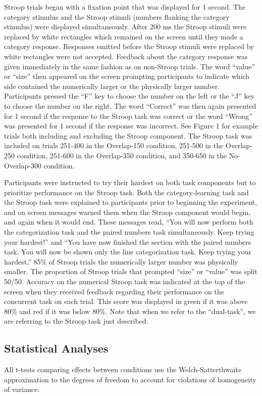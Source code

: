 \documentclass[apacite,draftfirst,man]{apa6}
\begin{document}
Stroop trials began with a fixation point that was displayed for 1 second. The
category stimulus and the Stroop stimuli (numbers flanking the category
stimulus) were displayed simultaneously. After 200 ms the Stroop stimuli were
replaced by white rectangles which remained on the screen until they made a
category response. Responses emitted before the Stroop stimuli were replaced by
white rectangles were not accepted. Feedback about the category response was
given immediately in the same fashion as on non-Stroop trials. The word
``value'' or ``size'' then appeared on the screen prompting participants to
indicate which side contained the numerically larger or the physically larger
number. Participants pressed the ``F'' key to choose the number on the left or
the ``J'' key to choose the number on the right. The word ``Correct'' was then
again presented for 1 second if the response to the Stroop task was correct or
the word ``Wrong'' was presented for 1 second if the response was incorrect. See
Figure 1 for example trials both including and excluding the Stroop component.
The Stroop task was included on trials 251-400 in the Overlap-150 condition,
251-500 in the Overlap-250 condition, 251-600 in the Overlap-350 condition, and
350-650 in the No-Overlap-300 condition.

Participants were instructed to try their hardest on both task components but to
prioritize performance on the Stroop task. Both the category-learning task and
the Stroop task were explained to participants prior to beginning the
experiment, and on screen messages warned them when the Stroop component would
begin, and again when it would end. These messages read, ``You will now perform
both the categorization task and the paired numbers task simultaneously. Keep
trying your hardest!'' and ``You have now finished the section with the paired
numbers task. You will now be shown only the line categorization task. Keep
trying your hardest.'' 85\% of Stroop trials the numerically larger number was
physically smaller. The proportion of Stroop trials that prompted ``size'' or
``value'' was split 50/50. Accuracy on the numerical Stroop task was indicated
at the top of the screen when they received feedback regarding their performance
on the concurrent task on each trial. This score was displayed in green if it
was above 80\% and red if it was below 80\%. Note that when we refer to the
``dual-task'', we are referring to the Stroop task just described.

\subsection*{Statistical Analyses}
All t-tests comparing effects between conditions use the Welch-Satterthwaite
approximation to the degrees of freedom to account for violations of homogeneity
of variance.
\end{document}
